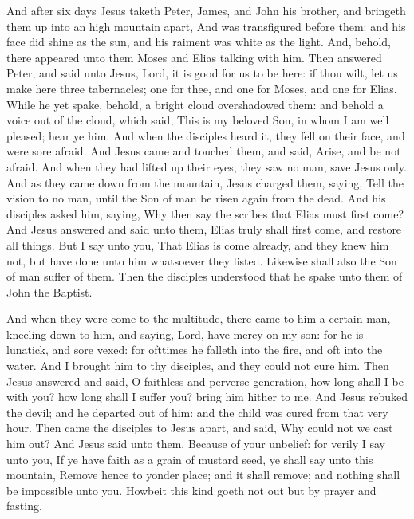  And after six days Jesus taketh Peter, James, and John his
brother, and bringeth them up into an high mountain apart, 
And was transfigured before them: and his face did shine as the sun, and
his raiment was white as the light.  And, behold, there
appeared unto them Moses and Elias talking with him.  Then
answered Peter, and said unto Jesus, Lord, it is good for us to be here:
if thou wilt, let us make here three tabernacles; one for thee, and one
for Moses, and one for Elias.  While he yet spake, behold, a
bright cloud overshadowed them: and behold a voice out of the cloud,
which said, This is my beloved Son, in whom I am well pleased; hear ye
him.  And when the disciples heard it, they fell on their
face, and were sore afraid.  And Jesus came and touched
them, and said, Arise, and be not afraid.  And when they had
lifted up their eyes, they saw no man, save Jesus only.  And
as they came down from the mountain, Jesus charged them, saying, Tell
the vision to no man, until the Son of man be risen again from the dead.
 And his disciples asked him, saying, Why then say the
scribes that Elias must first come?  And Jesus answered and
said unto them, Elias truly shall first come, and restore all things.
 But I say unto you, That Elias is come already, and they
knew him not, but have done unto him whatsoever they listed. Likewise
shall also the Son of man suffer of them.  Then the
disciples understood that he spake unto them of John the Baptist.

 And when they were come to the multitude, there came to
him a certain man, kneeling down to him, and saying,  Lord,
have mercy on my son: for he is lunatick, and sore vexed: for ofttimes
he falleth into the fire, and oft into the water.  And I
brought him to thy disciples, and they could not cure him. 
Then Jesus answered and said, O faithless and perverse generation, how
long shall I be with you? how long shall I suffer you? bring him hither
to me.  And Jesus rebuked the devil; and he departed out of
him: and the child was cured from that very hour.  Then
came the disciples to Jesus apart, and said, Why could not we cast him
out?  And Jesus said unto them, Because of your unbelief:
for verily I say unto you, If ye have faith as a grain of mustard seed,
ye shall say unto this mountain, Remove hence to yonder place; and it
shall remove; and nothing shall be impossible unto you. 
Howbeit this kind goeth not out but by prayer and fasting.

